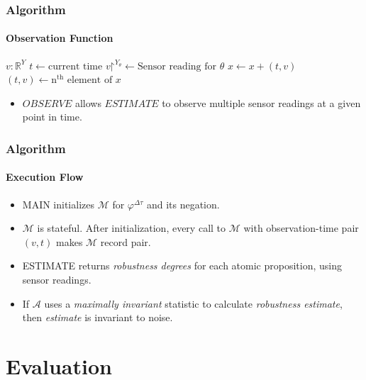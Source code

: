 \documentclass{beamer}
\renewcommand{\restriction}{\mathord{\upharpoonright}}
\newcommand{\typeReal}{\mathbb{R}}
\newcommand{\typeNat}{\mathbb{N}}
\newcommand{\M}{\mathcal{M}}
\newcommand{\A}{\mathcal{A}}
\begin{document}
\begin{frame}
    \frametitle{Algorithm}
    \framesubtitle{Observation Function}
        \begin{algorithmic}
            \Function{observe}{$n:\typeNat$}
                \State $v : \typeReal^{Y}$
                \State $t \gets \text{current time}$
            \ForAll{$\theta \in \Theta$}
                \State $v\restriction^{Y_{\theta}} \gets \text{Sensor reading for } \theta$
            \EndFor
                \State $x \gets x + (t, v)$
            \EndWhile
            \State $(t, v) \gets \text{n}^{\text{th}} \text{ element of } x$
            \State \Return{$(t, v\restriction^{Y_\theta})$}
            \EndFunction
        \end{algorithmic}
    \begin{itemize}
        \item $OBSERVE$ allows $ESTIMATE$ to observe multiple
            sensor readings at a given point in time.
    \end{itemize}
\end{frame}

\begin{frame}
    \frametitle{Algorithm}
    \framesubtitle{Execution Flow}
    \begin{itemize}
        \item MAIN initializes $\M$ for $\varphi^{\Delta\tau}$ and its negation.
        \item $\M$ is stateful. After initialization, every
            call to $\M$ with observation-time pair $(v,t)$
            makes $\M$ record pair.
        \item ESTIMATE returns \textit{robustness degrees}
            for each atomic proposition, using sensor readings.
        \item If $\A$ uses a \textit{maximally invariant}
            statistic to calculate \textit{robustness estimate},
            then \textit{estimate} is invariant to noise.
    \end{itemize}
\end{frame}

\section{Evaluation}
\end{document}
